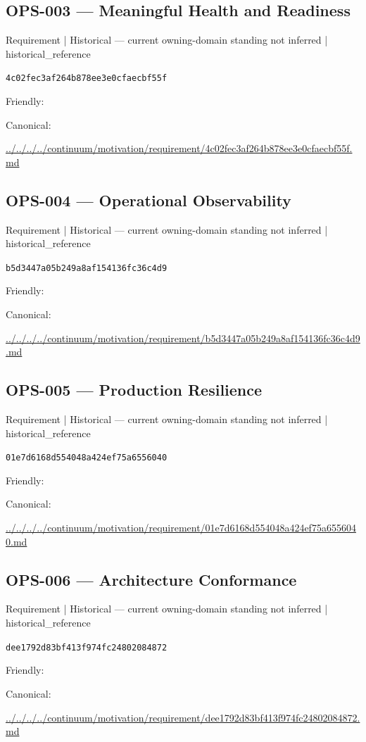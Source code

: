 \documentclass[10pt,a4paper]{article}
\begin{document}
\subsection*{OPS-003 — Meaningful Health and Readiness}
{\small Requirement | Historical — current owning-domain standing not inferred | historical\_reference}\par
\texttt{4c02fec3af264b878ee3e0cfaecbf55f}\par
Friendly: \par
Canonical: \par
{\footnotesize\url{../../../../continuum/motivation/requirement/4c02fec3af264b878ee3e0cfaecbf55f.md}}\par
\subsection*{OPS-004 — Operational Observability}
{\small Requirement | Historical — current owning-domain standing not inferred | historical\_reference}\par
\texttt{b5d3447a05b249a8af154136fc36c4d9}\par
Friendly: \par
Canonical: \par
{\footnotesize\url{../../../../continuum/motivation/requirement/b5d3447a05b249a8af154136fc36c4d9.md}}\par
\subsection*{OPS-005 — Production Resilience}
{\small Requirement | Historical — current owning-domain standing not inferred | historical\_reference}\par
\texttt{01e7d6168d554048a424ef75a6556040}\par
Friendly: \par
Canonical: \par
{\footnotesize\url{../../../../continuum/motivation/requirement/01e7d6168d554048a424ef75a6556040.md}}\par
\subsection*{OPS-006 — Architecture Conformance}
{\small Requirement | Historical — current owning-domain standing not inferred | historical\_reference}\par
\texttt{dee1792d83bf413f974fc24802084872}\par
Friendly: \par
Canonical: \par
{\footnotesize\url{../../../../continuum/motivation/requirement/dee1792d83bf413f974fc24802084872.md}}\par
\end{document}
